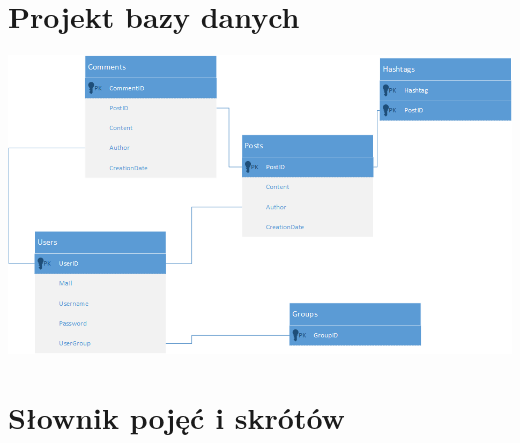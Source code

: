 \documentclass[a4paper]{article}
\begin{document}
\section{Projekt bazy danych}
\includegraphics[width=\textwidth]{database}

\section{Słownik pojęć i skrótów}

\begin{tabular}{|p{3cm}| p{7cm}|}
\hline

\hline
\end{tabular}
\end{document}
